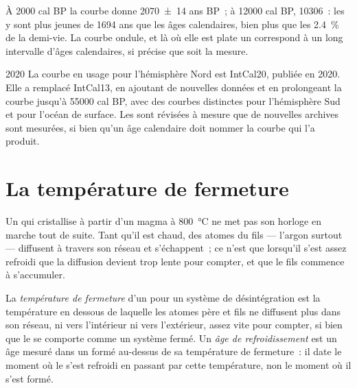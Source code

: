 À \num{2000} cal BP la courbe donne \num[uncertainty-mode=separate]{2070 \pm 14} ans BP~; à
\num{12000} cal BP, \num{10306}~: les  y sont plus jeunes de \num{1694} ans
que les âges calendaires, bien plus que les \qty{2.4}{\percent} de la
demi-vie. La courbe ondule, et là où elle est plate un  correspond à un
long intervalle d'âges calendaires, si précise que soit la mesure.

\begin{dated}{2020}
La courbe en usage pour l'hémisphère Nord est IntCal20, publiée en 2020. Elle a
remplacé IntCal13, en ajoutant de nouvelles données et en prolongeant la courbe jusqu'à \num{55000} cal BP,
avec des courbes distinctes pour l'hémisphère Sud et pour l'océan de surface.
Les  sont révisées à mesure que de nouvelles archives sont mesurées, si bien qu'un âge
calendaire doit nommer la courbe qui l'a produit.
\end{dated}

\section{La température de fermeture}\label{sec:b1:radiometric-methods:closure}

Un  qui cristallise à partir d'un magma à \qty{800}{\celsius} ne met pas son horloge
en marche tout de suite. Tant qu'il est chaud, des atomes du fils --- l'argon surtout ---
diffusent à travers son réseau et s'échappent~; ce n'est que lorsqu'il s'est assez refroidi que
la diffusion devient trop lente pour compter, et que le fils commence à s'accumuler.

\begin{definition}\label{def:b1:radiometric-methods:closure}
La \emph{température de fermeture} d'un  pour un
système de désintégration est la température en dessous de laquelle les atomes père et fils ne
diffusent plus dans son réseau, ni vers l'intérieur ni vers l'extérieur, assez vite pour compter, si bien que le
 se comporte comme un système fermé. Un \emph{âge de refroidissement} est un
âge mesuré dans un  formé au-dessus de sa température de fermeture~: il date
le moment où le  s'est refroidi en passant par cette température, non le moment où il
s'est formé.
\end{definition}

